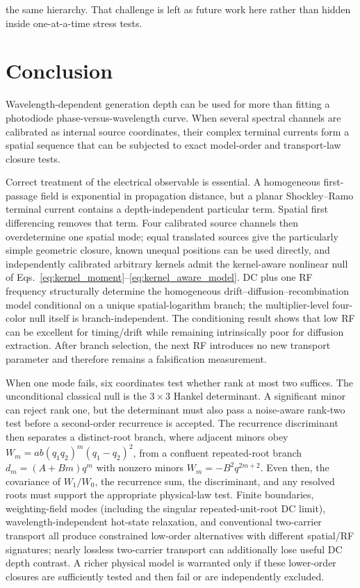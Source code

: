 \documentclass[11pt]{article}
\begin{document}
the same hierarchy. That challenge is left as future work here rather than hidden inside one-at-a-time stress tests.

\section{Conclusion}

Wavelength-dependent generation depth can be used for more than fitting a photodiode phase-versus-wavelength curve. When several spectral channels are calibrated as internal source coordinates, their complex terminal currents form a spatial sequence that can be subjected to exact model-order and transport-law closure tests.

Correct treatment of the electrical observable is essential. A homogeneous first-passage field is exponential in propagation distance, but a planar Shockley--Ramo terminal current contains a depth-independent particular term. Spatial first differencing removes that term. Four calibrated source channels then overdetermine one spatial mode; equal translated sources give the particularly simple geometric closure, known unequal positions can be used directly, and independently calibrated arbitrary kernels admit the kernel-aware nonlinear null of Eqs.~\eqref{eq:kernel_moment}--\eqref{eq:kernel_aware_model}. DC plus one RF frequency structurally determine the homogeneous drift--diffusion--recombination model conditional on a unique spatial-logarithm branch; the multiplier-level four-color null itself is branch-independent. The conditioning result shows that low RF can be excellent for timing/drift while remaining intrinsically poor for diffusion extraction. After branch selection, the next RF introduces no new transport parameter and therefore remains a falsification measurement.

When one mode fails, six coordinates test whether rank at most two suffices. The unconditional classical null is the $3\times3$ Hankel determinant. A significant minor can reject rank one, but the determinant must also pass a noise-aware rank-two test before a second-order recurrence is accepted. The recurrence discriminant then separates a distinct-root branch, where adjacent minors obey $W_m=ab(q_1q_2)^m(q_1-q_2)^2$, from a confluent repeated-root branch $d_m=(A+Bm)q^m$ with nonzero minors $W_m=-B^2q^{2m+2}$. Even then, the covariance of $W_1/W_0$, the recurrence sum, the discriminant, and any resolved roots must support the appropriate physical-law test. Finite boundaries, weighting-field modes (including the singular repeated-unit-root DC limit), wavelength-independent hot-state relaxation, and conventional two-carrier transport all produce constrained low-order alternatives with different spatial/RF signatures; nearly lossless two-carrier transport can additionally lose useful DC depth contrast. A richer physical model is warranted only if these lower-order closures are sufficiently tested and then fail or are independently excluded.
\end{document}
